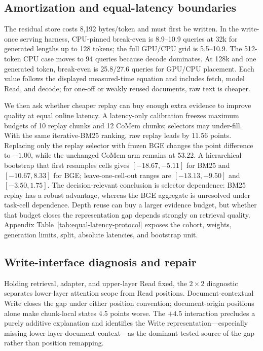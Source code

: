 \subsection{Amortization and equal-latency boundaries}


The residual store costs 8,192 bytes/token and must first be written. In the
write-once serving harness, CPU-pinned break-even is 8.9--10.9 queries at 32k
for generated lengths up to 128 tokens; the full GPU/CPU grid is 5.5--10.9.
The 512-token CPU case moves to 94 queries because decode dominates. At 128k
and one generated token, break-even is 25.8/27.6 queries for GPU/CPU placement.
Each value follows the displayed measured-time equation and includes fetch,
model Read, and decode; for one-off or weakly reused documents, raw text is
cheaper.



We then ask whether cheaper replay can buy enough extra evidence to improve
quality at equal online latency. A latency-only calibration freezes maximum
budgets of 10 replay chunks and 12 CoMem chunks; selectors may under-fill.
With the same iterative-BM25 ranking, raw replay
leads by 11.56 points. Replacing only the replay selector with frozen BGE changes
the point difference to $-1.00$, while the unchanged CoMem arm remains at
53.22. A hierarchical bootstrap that first resamples cells gives
$[-18.67,-5.11]$ for BM25 and $[-10.67,8.33]$ for BGE; leave-one-cell-out
ranges are $[-13.13,-9.50]$ and $[-3.50,1.75]$. The decision-relevant conclusion is selector dependence: BM25 replay has a
robust advantage, whereas the BGE aggregate is unresolved under task-cell
dependence. Depth reuse can buy a larger evidence budget, but whether that
budget closes the representation gap depends strongly on retrieval quality.
Appendix Table~\ref{tab:equal-latency-protocol} exposes the cohort, weights,
generation limits, split, absolute latencies, and bootstrap unit.

\subsection{Write-interface diagnosis and repair}



Holding retrieval, adapter, and upper-layer Read fixed, the $2{\times}2$
diagnostic separates lower-layer attention scope from Read positions.
Document-contextual Write closes the gap under either position convention;
document-origin positions alone make chunk-local states 4.5 points worse. The $+4.5$ interaction precludes a purely additive explanation and identifies
the Write representation---especially missing lower-layer document context---as
the dominant tested source of the gap rather than position remapping.

